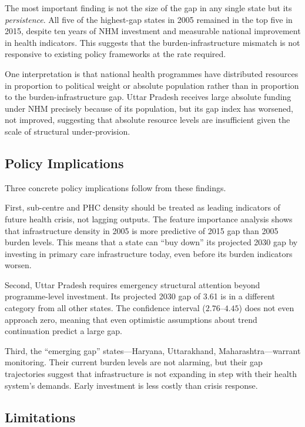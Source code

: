 \documentclass[conference]{IEEEtran}
\begin{document}
The most important finding is not the size of the gap in any single
state but its \emph{persistence}. All five of the highest-gap states
in 2005 remained in the top five in 2015, despite ten years of NHM
investment and measurable national improvement in health indicators.
This suggests that the burden-infrastructure mismatch is not
responsive to existing policy frameworks at the rate required.

One interpretation is that national health programmes have distributed
resources in proportion to political weight or absolute population
rather than in proportion to the burden-infrastructure gap. Uttar
Pradesh receives large absolute funding under NHM precisely because
of its population, but its gap index has worsened, not improved,
suggesting that absolute resource levels are insufficient given the
scale of structural under-provision.

\subsection{Policy Implications}

Three concrete policy implications follow from these findings.

First, sub-centre and PHC density should be treated as leading
indicators of future health crisis, not lagging outputs. The feature
importance analysis shows that infrastructure density in 2005 is more
predictive of 2015 gap than 2005 burden levels. This means that a
state can ``buy down'' its projected 2030 gap by investing in primary
care infrastructure today, even before its burden indicators worsen.

Second, Uttar Pradesh requires emergency structural attention beyond
programme-level investment. Its projected 2030 gap of 3.61 is in a
different category from all other states. The confidence interval
($2.76$--$4.45$) does not even approach zero, meaning that even
optimistic assumptions about trend continuation predict a large gap.

Third, the ``emerging gap'' states---Haryana, Uttarakhand,
Maharashtra---warrant monitoring. Their current burden levels are
not alarming, but their gap trajectories suggest that infrastructure
is not expanding in step with their health system's demands. Early
investment is less costly than crisis response.

\subsection{Limitations}
\end{document}
